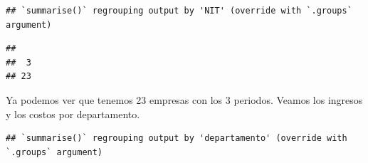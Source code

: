 \documentclass[
  11pt,
]{article}
\newenvironment{Shaded}{\begin{snugshade}}{\end{snugshade}}
\newcommand{\DataTypeTok}[1]{\textcolor[rgb]{0.13,0.29,0.53}{#1}}
\newcommand{\DecValTok}[1]{\textcolor[rgb]{0.00,0.00,0.81}{#1}}
\newcommand{\KeywordTok}[1]{\textcolor[rgb]{0.13,0.29,0.53}{\textbf{#1}}}
\newcommand{\NormalTok}[1]{#1}
\newcommand{\OperatorTok}[1]{\textcolor[rgb]{0.81,0.36,0.00}{\textbf{#1}}}
\newcommand{\StringTok}[1]{\textcolor[rgb]{0.31,0.60,0.02}{#1}}
\begin{document}
\begin{verbatim}
## `summarise()` regrouping output by 'NIT' (override with `.groups` argument)
\end{verbatim}

\begin{Shaded}
\end{Shaded}

\begin{verbatim}
## 
##  3 
## 23
\end{verbatim}

Ya podemos ver que tenemos 23 empresas con los 3 periodos. Veamos los
ingresos y los costos por departamento.

\begin{Shaded}
\end{Shaded}

\begin{verbatim}
## `summarise()` regrouping output by 'departamento' (override with `.groups` argument)
\end{verbatim}
\end{document}

